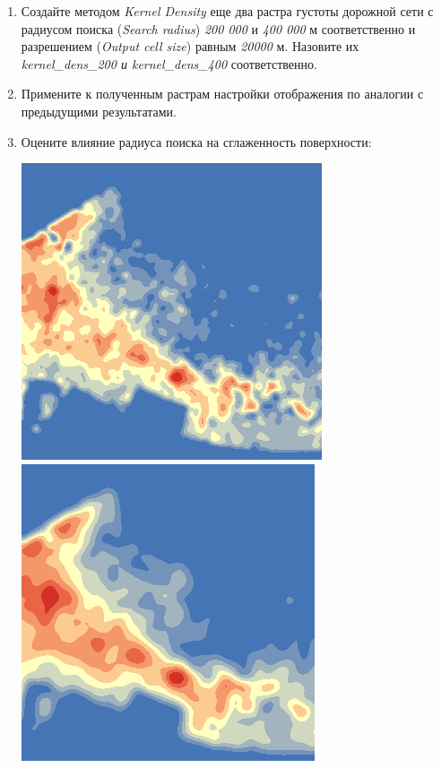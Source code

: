 \documentclass[]{book}
\theoremstyle{definition}
\theoremstyle{definition}
\theoremstyle{definition}
\theoremstyle{remark}
\begin{document}
\begin{enumerate}
\def\labelenumi{\arabic{enumi}.}
\item
  Создайте методом \emph{Kernel Density} еще два растра густоты дорожной
  сети с радиусом поиска (\emph{Search radius}) \emph{200 000} и
  \emph{400 000} м соответственно и разрешением (\emph{Output cell
  size}) равным \emph{20000} м. Назовите их \emph{kernel\_dens\_200 и
  kernel\_dens\_400} соответственно.
\item
  Примените к полученным растрам настройки отображения по аналогии с
  предыдущими результатами.
\item
  Оцените влияние радиуса поиска на сглаженность поверхности:

  \includegraphics{images/Ex15/image11.png}
  \includegraphics{images/Ex15/image12.png}

\end{enumerate}
\end{document}
